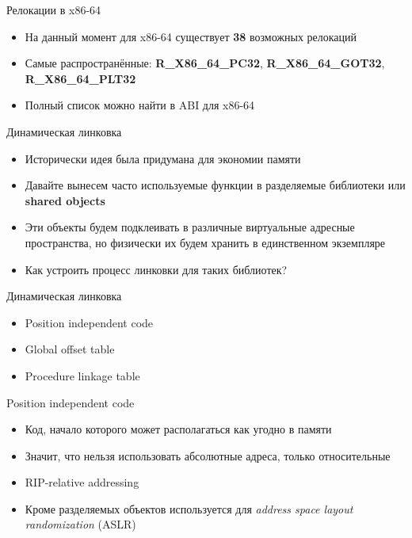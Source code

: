 \documentclass[10pt,pdf,hyperref={unicode}]{beamer}
\begin{document}
\begin{frame}{Релокации в x86-64}
\begin{itemize}
    \item На данный момент для x86-64 существует \textbf{38} возможных релокаций
    \item Самые распространённые: \textbf{R\_X86\_64\_PC32}, \textbf{R\_X86\_64\_GOT32}, \textbf{R\_X86\_64\_PLT32}
    \item Полный список можно найти в ABI для x86-64
\end{itemize}
\end{frame}

\begin{frame}{Динамическая линковка}
\begin{itemize}
    \item Исторически идея была придумана для экономии памяти
    \item Давайте вынесем часто используемые функции в разделяемые библиотеки или \textbf{shared objects}
    \item Эти объекты будем подклеивать в различные виртуальные адресные пространства, но физически их будем хранить в единственном экземпляре
    \item Как устроить процесс линковки для таких библиотек?
\end{itemize}
\end{frame}

\begin{frame}{Динамическая линковка}
\begin{itemize}
    \item Position independent code
    \item Global offset table
    \item Procedure linkage table
\end{itemize}
\end{frame}

\begin{frame}{Position independent code}
\begin{itemize}
    \item Код, начало которого может располагаться как угодно в памяти
    \item Значит, что нельзя использовать абсолютные адреса, только относительные
    \item RIP-relative addressing
    \item Кроме разделяемых объектов используется для \emph{address space layout randomization} (ASLR)
\end{itemize}
\end{frame}
\end{document}
